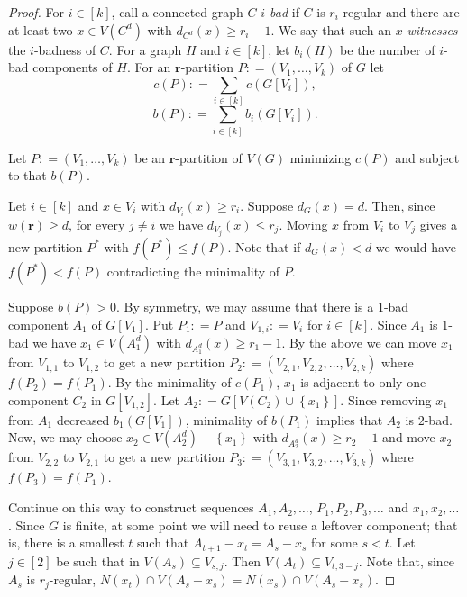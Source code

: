 \documentclass[12pt]{amsart}
\theoremstyle{plain}
\theoremstyle{definition}
\theoremstyle{remark}
\newcommand{\set}[1]{\left\{ #1 \right\}}
\newcommand{\irange}[1]{\left[#1\right]}
\newcommand{\parens}[1]{\left( #1 \right)}
\newcommand{\DefinedAs}{\mathrel{\mathop:}=}
\newcommand{\mov}[2]{#1^{#2}}
\newcommand{\wt}[1]{w\parens{#1}}
\renewcommand{\vec}[1]{\mathbf{#1}}
\begin{document}
		\begin{proof}
			For $i \in \irange{k}$, call a connected graph $C$
			\emph{$i$-bad} if $C$ is $r_i$-regular and there are at least two $x \in
			V(\mov{C}{d})$ with $d_{\mov{C}{d}}(x) \geq r_i - 1$. We say that such an $x$ \emph{witnesses} the $i$-badness of $C$.  For a graph $H$ and $i
			\in \irange{k}$, let $b_i(H)$ be the number of $i$-bad components of $H$.
			For an $\vec{r}$-partition $P \DefinedAs \parens{V_1, \ldots, V_k}$ of $G$ let
			\[c(P) \DefinedAs \sum_{i \in \irange{k}} c(G[V_i]),\]
			\[b(P) \DefinedAs \sum_{i\in \irange{k}} b_i(G[V_i]).\]
			
			\noindent Let $P \DefinedAs \parens{V_1, \ldots, V_k}$ be an $\vec{r}$-partition of
			$V(G)$ minimizing $c(P)$ and subject to that $b(P)$.

			Let $i \in \irange{k}$ and $x \in V_i$ with $d_{V_i}(x) \geq r_i$.  Suppose $d_G(x) = d$.
			Then, since $\wt{\vec{r}} \geq d$, for every $j \neq i$ we have $d_{V_j}(x) \leq
			r_j$. Moving $x$ from $V_i$ to $V_j$ gives a new partition $P^*$ with $f(P^*)
			\leq f(P)$. Note that if $d_{G}(x) < d$ we would have $f(P^*) < f(P)$
			contradicting the minimality of $P$.

			Suppose $b(P) > 0$.  By symmetry, we may assume that there is a
			$1$-bad component $A_1$ of $G[V_{1}]$. Put $P_1 \DefinedAs P$ and $V_{1,i}
			\DefinedAs V_i$ for $i \in \irange{k}$. Since $A_1$ is $1$-bad we have $x_1
			\in V(\mov{A_1}{d})$ with $d_{\mov{A_1}{d}}(x) \geq r_1 -1$. By the above we
			can move $x_1$ from $V_{1, 1}$ to $V_{1, 2}$ to get a new partition $P_2
			\DefinedAs \parens{V_{2, 1}, V_{2,2}, \ldots, V_{2,k}}$ where $f(P_2) = f(P_1)$.  
			By the minimality of $c(P_1)$, $x_1$ is adjacent to only one component $C_2$
			in $G[V_{1, 2}]$. Let $A_2 \DefinedAs G[V(C_2) \cup \set{x_1}]$.  
			Since removing $x_1$ from $A_1$ decreased $b_{1}(G[V_{1}])$, minimality of
			$b(P_1)$ implies that $A_2$ is $2$-bad. Now, we may choose $x_2 \in
			V(\mov{A_2}{d}) - \set{x_1}$ with $d_{\mov{A_2}{d}}(x) \geq r_2 -1$ and move
			$x_2$ from $V_{2, 2}$ to $V_{2, 1}$ to get a new partition $P_3
			\DefinedAs \parens{V_{3, 1}, V_{3,2}, \ldots, V_{3,k}}$ where $f(P_3) =
			f(P_1)$.
						
			Continue on this way to construct sequences $A_1, A_2, \ldots$, $P_1, P_2, P_3, \ldots$ and $x_1, x_2, \ldots$.  
			Since $G$ is finite, at some point we will need to reuse a leftover component; that is, 
			there is a smallest $t$ such that $A_{t + 1} - x_t = A_s - x_s$ for some $s <
			t$.  Let $j \in \irange{2}$ be such that in $V(A_s) \subseteq V_{s, j}$. 
			Then $V(A_t) \subseteq V_{t, 3-j}$.  Note that, since $A_s$ is $r_j$-regular,
			$N(x_t) \cap V(A_s - x_s) = N(x_s) \cap V(A_s - x_s)$.
			

\end{proof}
\end{document}
